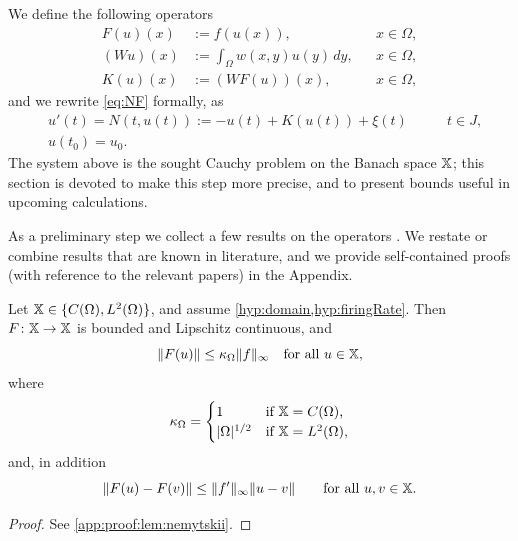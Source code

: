 \documentclass[a4paper,baskervaldx]{daarticle}
\begin{document}
%
We define the following operators
\begin{align}
  F(u)(x) & := f(u(x)),               & & x \in \Omega, \label{eq:NemOp} \\ 
  (Wu)(x) & := \int_\Omega w(x,y) u(y)\, dy, & & x \in \Omega, \label{eq:WOp} \\
  K(u)(x) & := (WF(u))(x),         & & x \in \Omega, \label{eq:KOp}
\end{align}
and we rewrite \cref{eq:NF} formally, as
\[
  \begin{aligned}
    & u'(t) = N(t,u(t)):=-u(t) + K(u(t)) + \xi(t) \qquad & t \in J, \\
    & u(t_0) = u_0.
  \end{aligned}
\]
The system above is the sought Cauchy problem on the Banach space $\mathbb{X}$; this
section is devoted to make this step more precise, and to present bounds useful in
upcoming calculations.
%
%

%
As a preliminary step we collect a few results on the operators . We restate or combine results that are known in
literature, and we provide self-contained proofs (with reference to the relevant
papers) in the Appendix.

\begin{lemma}\label{lem:nemytskii}
  Let $\mathbb{X} \in \{C(\Omega),L^2(\Omega)\}$, and assume
  \cref{hyp:domain,hyp:firingRate}. Then 
  $F \colon \mathbb{X} \to \mathbb{X}$ is bounded and Lipschitz continuous, and
  \begin{equation} \label{eq:boundF}
   \|F(u)\| \leq \kappa_\Omega \|f \|_\infty \quad \text{for all $u \in \mathbb{X}$,}
  \end{equation}
  where 
  \begin{equation}\label{eq:kappaOmega}
   \kappa_\Omega = 
      \begin{cases}
	1              & \text{if $\mathbb{X} = C(\Omega)$,} \\
	|\Omega|^{1/2} & \text{if $\mathbb{X} = L^2(\Omega)$,} 
      \end{cases}
    \end{equation}
   and, in addition
   \begin{equation} \label{eq:LipF}
   \| F(u) - F(v) \| \leq \| f' \|_\infty \| u - v \| \qquad \text{for all $u,v \in \mathbb{X}$.}
 \end{equation}
\end{lemma}
\begin{proof}
  See \cref{app:proof:lem:nemytskii}.
\end{proof}
\end{document}
